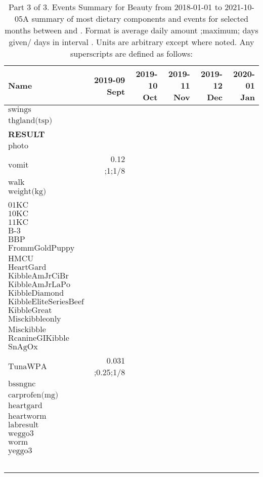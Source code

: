 \begin{table}[H]
\centering
\begin{tabular}{|l|r|r|r|r|r|}
\hline
Name&2019-09 Sept&2019-10 Oct&2019-11 Nov&2019-12 Dec&2020-01 Jan\\
\hline
$\textrm{swings}$&&&&&\\
$\textrm{thgland(tsp)}$&&&&&\\
{\bf RESULT}&&&&&\\
$\textrm{photo}$&&&&&\\
$\textrm{vomit}$&0.12 ;1;1/8&&&&\\
$\textrm{walk}$&&&&&\\
$\textrm{weight(kg)}$&&&&&\\
&&&&&\\
$\textrm{01KC}$&&&&&\\
$\textrm{10KC}$&&&&&\\
$\textrm{11KC}$&&&&&\\
$\textrm{B-3}$&&&&&\\
$\textrm{BBP}$&&&&&\\
$\textrm{FrommGoldPuppy}$&&&&&\\
$\textrm{HMCU}$&&&&&\\
$\textrm{HeartGard}$&&&&&\\
$\textrm{KibbleAmJrCiBr}$&&&&&\\
$\textrm{KibbleAmJrLaPo}$&&&&&\\
$\textrm{KibbleDiamond}$&&&&&\\
$\textrm{KibbleEliteSeriesBeef}$&&&&&\\
$\textrm{KibbleGreat}$&&&&&\\
$\textrm{Misckibbleonly}$&&&&&\\
$\textrm{Misckibble}$&&&&&\\
$\textrm{RcanineGIKibble}$&&&&&\\
$\textrm{SnAgOx}$&&&&&\\
$\textrm{TunaWPA}$&0.031 ;0.25;1/8&&&&\\
$\textrm{bssngnc}$&&&&&\\
$\textrm{carprofen(mg)}$&&&&&\\
$\textrm{heartgard}$&&&&&\\
$\textrm{heartworm}$&&&&&\\
$\textrm{labresult}$&&&&&\\
$\textrm{weggo3}$&&&&&\\
$\textrm{worm}$&&&&&\\
$\textrm{yeggo3}$&&&&&\\
&&&&&\\
&&&&&\\
&&&&&\\
&&&&&\\
&&&&&\\
\hline
\end{tabular}
\caption{Part 3 of 3.  Events Summary for Beauty   from 2018-01-01 to 2021-10-05A summary of most dietary components and events  for selected months between \mjmdatemin and \mjmdatemax. Format is average daily amount ;maximum; days given/ days in interval . Units are arbitrary except where noted. Any  superscripts are defined as follows:  \mjmsuperscripts}
\end{table}
